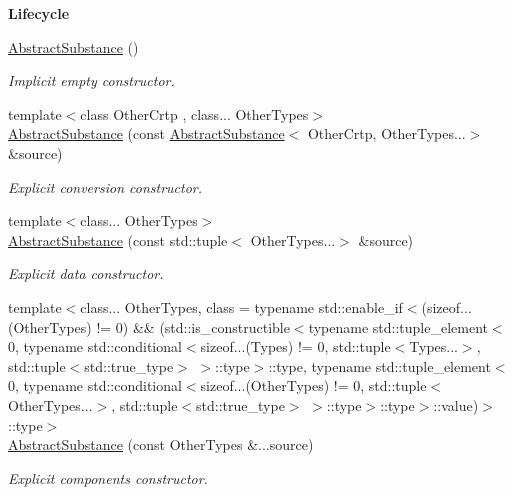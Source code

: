 \begin{Indent}{\bf Lifecycle}\par
\begin{DoxyCompactItemize}
\item 
\hyperlink{classmagrathea_1_1AbstractSubstance_a71efefd54067b3d17ae6289e1604f8d3}{Abstract\-Substance} ()
\begin{DoxyCompactList}\small\item\em Implicit empty constructor. \end{DoxyCompactList}\item 
{\footnotesize template$<$class Other\-Crtp , class... Other\-Types$>$ }\\\hyperlink{classmagrathea_1_1AbstractSubstance_a70eac8a47e9ce020737e4bb97494c22d}{Abstract\-Substance} (const \hyperlink{classmagrathea_1_1AbstractSubstance}{Abstract\-Substance}$<$ Other\-Crtp, Other\-Types...$>$ \&source)
\begin{DoxyCompactList}\small\item\em Explicit conversion constructor. \end{DoxyCompactList}\item 
{\footnotesize template$<$class... Other\-Types$>$ }\\\hyperlink{classmagrathea_1_1AbstractSubstance_a31871f06c979a499aee21325beb4044f}{Abstract\-Substance} (const std\-::tuple$<$ Other\-Types...$>$ \&source)
\begin{DoxyCompactList}\small\item\em Explicit data constructor. \end{DoxyCompactList}\item 
{\footnotesize template$<$class... Other\-Types, class  = typename std\-::enable\-\_\-if$<$(sizeof...(\-Other\-Types) != 0) \&\& (std\-::is\-\_\-constructible$<$typename std\-::tuple\-\_\-element$<$0, typename std\-::conditional$<$sizeof...(\-Types) != 0, std\-::tuple$<$\-Types...$>$, std\-::tuple$<$std\-::true\-\_\-type$>$ $>$\-::type$>$\-::type, typename std\-::tuple\-\_\-element$<$0, typename std\-::conditional$<$sizeof...(\-Other\-Types) != 0, std\-::tuple$<$\-Other\-Types...$>$, std\-::tuple$<$std\-::true\-\_\-type$>$ $>$\-::type$>$\-::type$>$\-::value)$>$\-::type$>$ }\\\hyperlink{classmagrathea_1_1AbstractSubstance_a0fa32c43c29b5ec178b7ea800d2c8899}{Abstract\-Substance} (const Other\-Types \&...source)
\begin{DoxyCompactList}\small\item\em Explicit components constructor. \end{DoxyCompactList}\end{DoxyCompactItemize}
\end{Indent}
